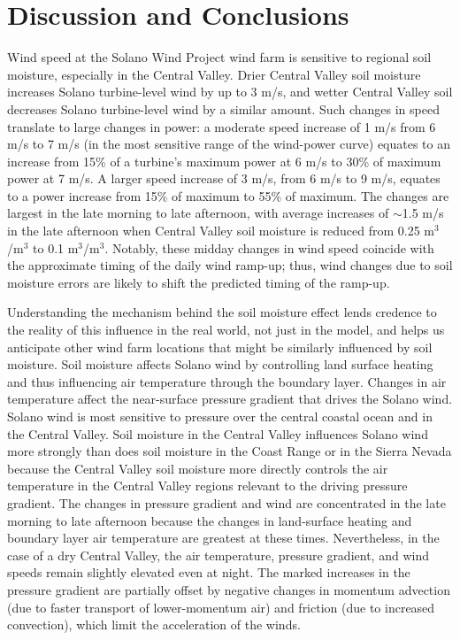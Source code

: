 
\section{Discussion and Conclusions}

Wind speed at the Solano Wind Project wind farm is sensitive to regional soil moisture, especially in the Central Valley.  Drier Central Valley soil moisture increases Solano turbine-level wind by up to 3 m/s, and wetter Central Valley soil decreases Solano turbine-level wind by a similar amount.  Such changes in speed translate to large changes in power: a moderate speed increase of 1 m/s from 6 m/s to 7 m/s (in the most sensitive range of the wind-power curve) equates to an increase from 15\% of a turbine's maximum power at 6 m/s to 30\% of maximum power at 7 m/s. A larger speed increase of 3 m/s, from 6 m/s to 9 m/s, equates to a power increase from 15\% of maximum to 55\% of maximum.  The changes are largest in the late morning to late afternoon, with average increases of $\sim$1.5 m/s in the late afternoon when Central Valley soil moisture is reduced from 0.25 m$^3$/m$^3$ to 0.1 m$^3$/m$^3$.  Notably, these midday changes in wind speed coincide with the approximate timing of the daily wind ramp-up; thus, wind changes due to soil moisture errors are likely to shift the predicted timing of the ramp-up.

Understanding the mechanism behind the soil moisture effect lends credence to the reality of this influence in the real world, not just in the model, and helps us anticipate other wind farm locations that might be similarly influenced by soil moisture.  Soil moisture affects Solano wind by controlling land surface heating and thus influencing air temperature through the boundary layer.  Changes in air temperature affect the near-surface pressure gradient that drives the Solano wind.  Solano wind is most sensitive to pressure over the central coastal ocean and in the Central Valley.  Soil moisture in the Central Valley influences Solano wind more strongly than does soil moisture in the Coast Range or in the Sierra Nevada because the Central Valley soil moisture more directly controls the air temperature in the Central Valley regions relevant to the driving pressure gradient.  The changes in pressure gradient and wind are concentrated in the late morning to late afternoon because the changes in land-surface heating and boundary layer air temperature are greatest at these times.  Nevertheless, in the case of a dry Central Valley, the air temperature, pressure gradient, and wind speeds remain slightly elevated even at night.  The marked increases in the pressure gradient are partially offset by negative changes in momentum advection (due to faster transport of lower-momentum air) and friction (due to increased convection), which limit the acceleration of the winds.

